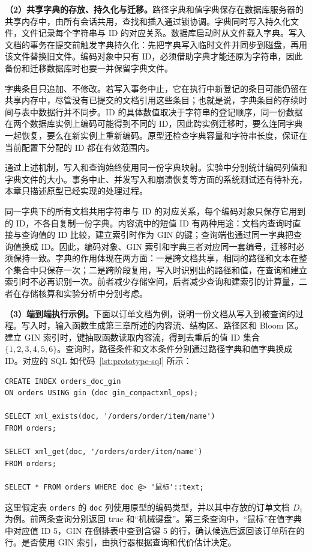 \textbf{（2）共享字典的存放、持久化与迁移。}路径字典和值字典保存在数据库服务器的共享内存中，由所有会话共用，查找和插入通过锁协调。字典同时写入持久化文件，文件记录每个字符串与 ID 的对应关系。数据库启动时从文件载入字典。写入文档的事务在提交前触发字典持久化：先把字典写入临时文件并同步到磁盘，再用该文件替换旧文件。编码对象中只有 ID，必须借助字典才能还原为字符串，因此备份和迁移数据库时也要一并保留字典文件。

字典条目只追加、不修改。若写入事务中止，它在执行中新登记的条目可能仍留在共享内存中，尽管没有已提交的文档引用这些条目；也就是说，字典条目的存续时间与表中数据行并不同步。ID 的具体数值取决于字符串的登记顺序，同一份数据在两个数据库实例上编码可能得到不同的 ID，因此跨实例迁移时，要么连同字典一起恢复，要么在新实例上重新编码。原型还检查字典容量和字符串长度，保证在当前配置下分配的 ID 都在有效范围内。

通过上述机制，写入和查询始终使用同一份字典映射。实验中分别统计编码列值和字典文件的大小。事务中止、并发写入和崩溃恢复等方面的系统测试还有待补充，本章只描述原型已经实现的处理过程。

同一字典下的所有文档共用字符串与 ID 的对应关系，每个编码对象只保存它用到的 ID，不各自复制一份字典。内容流中的短值 ID 有两种用途：文档内查询时直接与查询值的 ID 比较，建立索引时作为 GIN 的键；查询端也通过同一字典把查询值换成 ID。因此，编码对象、GIN 索引和字典三者对应同一套编号，迁移时必须保持一致。字典的作用体现在两方面：一是跨文档共享，相同的路径和文本在整个集合中只保存一次；二是跨阶段复用，写入时识别出的路径和值，在查询和建立索引时不必再识别一次。前者减少存储空间，后者减少查询和建索引的计算量，二者在存储核算和实验分析中分别考虑。

\textbf{（3）端到端执行示例。}下面以订单文档为例，说明一份文档从写入到被查询的过程。写入时，输入函数生成第三章所述的内容流、结构区、路径区和 Bloom 区。建立 GIN 索引时，键抽取函数读取内容流，得到去重后的值 ID 集合 $\{1,2,3,4,5,6\}$。查询时，路径条件和文本条件分别通过路径字典和值字典换成 ID。对应的 SQL 如代码~\ref{lst:prototype-sql} 所示：
\begin{lstlisting}[caption={类型值上的查询与索引调用示例},label={lst:prototype-sql},numbers=none]
CREATE INDEX orders_doc_gin
ON orders USING gin (doc gin_compactxml_ops);

SELECT xml_exists(doc, '/orders/order/item/name')
FROM orders;

SELECT xml_get(doc, '/orders/order/item/name')
FROM orders;

SELECT * FROM orders WHERE doc @> '鼠标'::text;
\end{lstlisting}
这里假定表 \texttt{orders} 的 \texttt{doc} 列使用原型的编码类型，并以其中存放的订单文档 $D_1$ 为例。前两条查询分别返回 true 和“机械键盘”。第三条查询中，“鼠标”在值字典中对应值 ID 5，GIN 在倒排表中查到含键 5 的行，确认候选后返回该订单所在的行。是否使用 GIN 索引，由执行器根据查询和代价估计决定。

